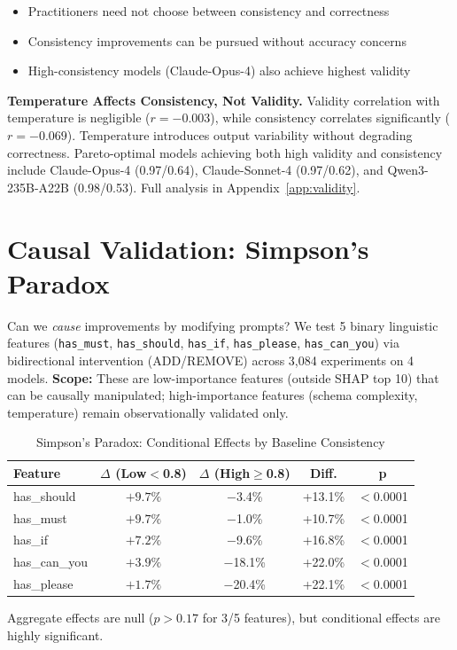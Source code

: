 \documentclass[sigconf,anonymous,review]{acmart}
\begin{document}
\begin{itemize}
    \item Practitioners need not choose between consistency and correctness
    \item Consistency improvements can be pursued without accuracy concerns
    \item High-consistency models (Claude-Opus-4) also achieve highest validity
\end{itemize}

\textbf{Temperature Affects Consistency, Not Validity.} Validity correlation with temperature is negligible ($r = -0.003$), while consistency correlates significantly ($r = -0.069$). Temperature introduces output variability without degrading correctness. Pareto-optimal models achieving both high validity and consistency include Claude-Opus-4 (0.97/0.64), Claude-Sonnet-4 (0.97/0.62), and Qwen3-235B-A22B (0.98/0.53). Full analysis in Appendix~\ref{app:validity}.

\section{Causal Validation: Simpson's Paradox}
\label{sec:causal}

Can we \textit{cause} improvements by modifying prompts? We test 5 binary linguistic features (\texttt{has\_must}, \texttt{has\_should}, \texttt{has\_if}, \texttt{has\_please}, \texttt{has\_can\_you}) via bidirectional intervention (ADD/REMOVE) across 3,084 experiments on 4 models. \textbf{Scope:} These are low-importance features (outside SHAP top 10) that can be causally manipulated; high-importance features (schema complexity, temperature) remain observationally validated only.

\begin{table}[t]
\centering
\caption{Simpson's Paradox: Conditional Effects by Baseline Consistency}
\label{tab:causal_conditional}
\small
\begin{tabular}{@{}lcccc@{}}
\toprule
\textbf{Feature} & \textbf{$\Delta$ (Low$<$0.8)}  & \textbf{$\Delta$ (High$\geq$0.8)} & \textbf{Diff.} & \textbf{p} \\
\midrule
has\_should & $\mathbf{+9.7\%}$ & $-$3.4\% & +13.1\% & $<$0.0001 \\
has\_must & $\mathbf{+9.7\%}$ & $-$1.0\% & +10.7\% & $<$0.0001 \\
has\_if & $\mathbf{+7.2\%}$ & $-$9.6\% & +16.8\% & $<$0.0001 \\
has\_can\_you & $\mathbf{+3.9\%}$ & $-$18.1\% & +22.0\% & $<$0.0001 \\
has\_please & $\mathbf{+1.7\%}$ & $-$20.4\% & +22.1\% & $<$0.0001 \\
\bottomrule
\end{tabular}
\vspace{0.3em}

\raggedright\footnotesize Aggregate effects are null ($p>0.17$ for 3/5 features), but conditional effects are highly significant.
\end{table}
\end{document}
